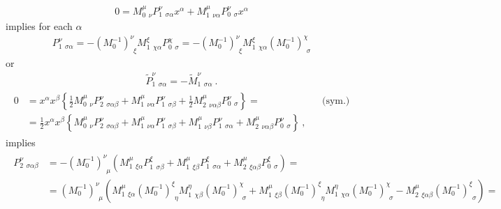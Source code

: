 \documentclass[letterpaper,10pt,english]{jupyterBook}
\begin{document}
\sphinxAtStartPar
{}
\begin{equation*}
\begin{split}
0 = M^{\mu}_{0 \ \ \nu} P^{\nu}_{1 \ \ \sigma \alpha } x^\alpha + M^{\mu}_{1 \ \ \nu \alpha} P^{\nu}_{0 \ \ \sigma} x^\alpha
\end{split}
\end{equation*}
\sphinxAtStartPar
implies for each \(\alpha\)
\begin{equation*}
\begin{split}
P^{\nu}_{1 \ \ \sigma \alpha} 
  = - \left( M^{-1}_0 \right)^{\nu}_{\ \ \xi} M^{\xi}_{1 \ \ \chi \alpha} P^{\chi}_{0 \ \ \sigma} 
  = - \left( M^{-1}_0 \right)^{\nu}_{\ \ \xi} M^{\xi}_{1 \ \ \chi \alpha} \left( M^{-1}_{0} \right)^{\chi}_{\ \ \sigma}
\end{split}
\end{equation*}
\sphinxAtStartPar
or
\begin{equation*}
\begin{split}\widetilde{P}^{\nu}_{1\ \ \sigma \alpha} = - \widetilde{M}^{\nu}_{1\ \ \sigma \alpha} \ .\end{split}
\end{equation*}
\sphinxAtStartPar
{}
\begin{equation*}
\begin{split}\begin{aligned}
0 
& = x^\alpha x^\beta \left\{ \frac{1}{2} M^{\mu}_{0 \ \ \nu} P^{\nu}_{2 \ \ \sigma \alpha \beta} + M^{\mu}_{1 \ \ \nu \alpha} P^{\nu}_{1 \ \ \sigma\beta} + \frac{1}{2} M^{\mu}_{2 \ \ \nu \alpha \beta} P^{\nu}_{0 \ \ \sigma} \right\} = && \text{(sym.)} \\
& = \frac{1}{2} x^\alpha x^\beta \left\{ M^{\mu}_{0 \ \ \nu} P^{\nu}_{2 \ \ \sigma \alpha \beta} + M^{\mu}_{1 \ \ \nu \alpha} P^{\nu}_{1 \ \ \sigma\beta} + M^{\mu}_{1 \ \ \nu \beta} P^{\nu}_{1 \ \ \sigma\alpha} + M^{\mu}_{2 \ \ \nu \alpha \beta} P^{\nu}_{0 \ \ \sigma} \right\} \ ,
\end{aligned}\end{split}
\end{equation*}
\sphinxAtStartPar
implies
\begin{equation*}
\begin{split}\begin{aligned}
P^{\nu}_{2 \ \ \sigma \alpha \beta} 
  & = - \left( M^{-1}_0 \right)^{\nu}_{\ \ \mu} \left( M^{\mu}_{1 \ \ \xi \alpha} P^{\xi}_{1 \ \ \sigma\beta} + M^{\mu}_{1 \ \ \xi \beta} P^{\xi}_{1 \ \ \sigma\alpha} + M^{\mu}_{2 \ \ \xi \alpha \beta} P^{\xi}_{0 \ \ \sigma} \right) = \\
  & =   \left( M^{-1}_0 \right)^{\nu}_{\ \ \mu} \left( M^{\mu}_{1 \ \ \xi \alpha} \left( M^{-1}_0 \right)^{\xi}_{\ \ \eta} M^{\eta}_{1 \ \ \chi \beta} \left( M^{-1}_{0} \right)^{\chi}_{\ \ \sigma} + M^{\mu}_{1 \ \ \xi \beta} \left( M^{-1}_0 \right)^{\xi}_{\ \ \eta} M^{\eta}_{1 \ \ \chi \alpha} \left( M^{-1}_{0} \right)^{\chi}_{\ \ \sigma} - M^{\mu}_{2 \ \ \xi \alpha \beta} \left( M^{-1}_0 \right)^{\xi}_{\ \ \sigma} \right) = \\
\end{aligned}\end{split}
\end{equation*}
\end{document}
